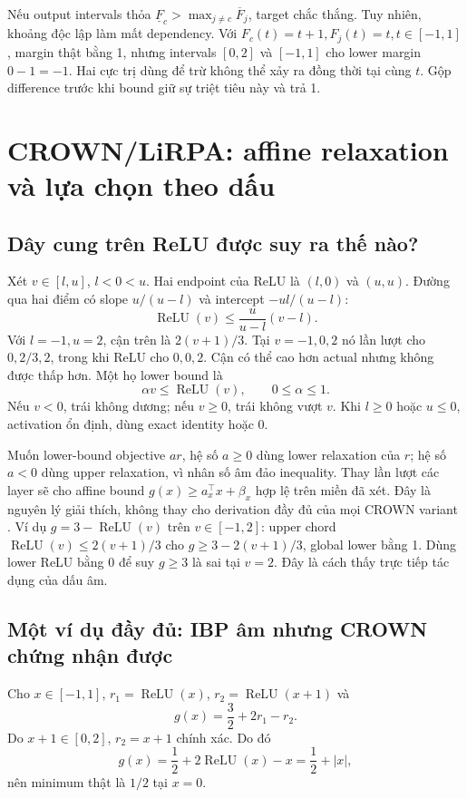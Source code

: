 \documentclass[11pt,a4paper]{article}
\newcommand{\relu}{\operatorname{ReLU}}
\theoremstyle{definition}
\begin{document}
Nếu output intervals thỏa $\underline F_c>\max_{j\ne c}\overline F_j$, target
chắc thắng. Tuy nhiên, khoảng độc lập làm mất dependency. Với
$F_c(t)=t+1,F_j(t)=t,t\in[-1,1]$, margin thật bằng 1, nhưng intervals
$[0,2]$ và $[-1,1]$ cho lower margin $0-1=-1$. Hai cực trị dùng để trừ
không thể xảy ra đồng thời tại cùng $t$. Gộp difference trước khi bound
giữ sự triệt tiêu này và trả 1.

\section{CROWN/LiRPA: affine relaxation và lựa chọn theo dấu}
\subsection{Dây cung trên ReLU được suy ra thế nào?}
Xét $v\in[l,u]$, $l<0<u$. Hai endpoint của ReLU là $(l,0)$ và $(u,u)$.
Đường qua hai điểm có slope $u/(u-l)$ và intercept $-ul/(u-l)$:
\begin{equation}
\relu(v)\le\frac{u}{u-l}(v-l).
\end{equation}
Với $l=-1,u=2$, cận trên là $2(v+1)/3$. Tại $v=-1,0,2$ nó lần lượt
cho $0,2/3,2$, trong khi ReLU cho $0,0,2$. Cận có thể cao hơn actual
nhưng không được thấp hơn. Một họ lower bound là
\begin{equation}
\alpha v\le\relu(v),\qquad0\le\alpha\le1.
\end{equation}
Nếu $v<0$, trái không dương; nếu $v\ge0$, trái không vượt $v$. Khi
$l\ge0$ hoặc $u\le0$, activation ổn định, dùng exact identity hoặc 0.

Muốn lower-bound objective $a r$, hệ số $a\ge0$ dùng lower relaxation của
$r$; hệ số $a<0$ dùng upper relaxation, vì nhân số âm đảo inequality.
Thay lần lượt các layer sẽ cho affine bound
$g(x)\ge a_x^\top x+\beta_x$ hợp lệ trên miền đã xét. Đây là nguyên lý
giải thích, không thay cho derivation đầy đủ của mọi CROWN variant
\cite{crown,lirpa}. Ví dụ $g=3-\relu(v)$ trên $v\in[-1,2]$:
upper chord $\relu(v)\le2(v+1)/3$ cho
$g\ge3-2(v+1)/3$, global lower bằng 1. Dùng lower ReLU bằng 0 để suy
$g\ge3$ là sai tại $v=2$. Đây là cách thấy trực tiếp tác dụng của dấu âm.

\subsection{Một ví dụ đầy đủ: IBP âm nhưng CROWN chứng nhận được}
Cho $x\in[-1,1]$, $r_1=\relu(x)$, $r_2=\relu(x+1)$ và
\begin{equation}
g(x)=\frac32+2r_1-r_2.
\end{equation}
Do $x+1\in[0,2]$, $r_2=x+1$ chính xác. Do đó
\begin{equation}
g(x)=\frac12+2\relu(x)-x=\frac12+|x|,
\end{equation}
nên minimum thật là $1/2$ tại $x=0$.
\end{document}

